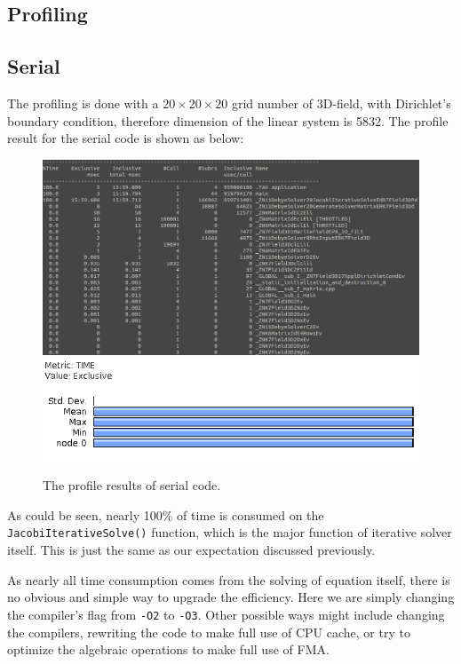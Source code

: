 \documentclass{article}
\begin{document}
\begin{spacing}{1.1}
\section{Profiling}

\subsection{Serial}

The profiling is done with a $ 20\times 20 \times 20$ grid number of 3D-field, with Dirichlet's boundary condition, therefore dimension of the linear system is 5832. The profile result for the serial code is shown as below:

\begin{figure}[H]
  \centering
  \includegraphics[width=\linewidth]{output/serial-previous-text.png}
  \includegraphics[width=0.6\linewidth]{output/serial-previous.png}
  \caption{The profile results of serial code.}
  \label{fig-testcase}
\end{figure}

As could be seen, nearly 100\% of time is consumed on the \texttt{JacobiIterativeSolve()} function, which is the major function of iterative solver itself. This is just the same as our expectation discussed previously.

As nearly all time consumption comes from the solving of equation itself, there is no obvious and simple way to upgrade the efficiency. Here we are simply changing the compiler's flag from \texttt{-O2} to \texttt{-O3}. Other possible ways might include changing the compilers, rewriting the code to make full use of CPU cache, or try to optimize the algebraic operations to make full use of FMA.


\end{spacing}
\end{document}
